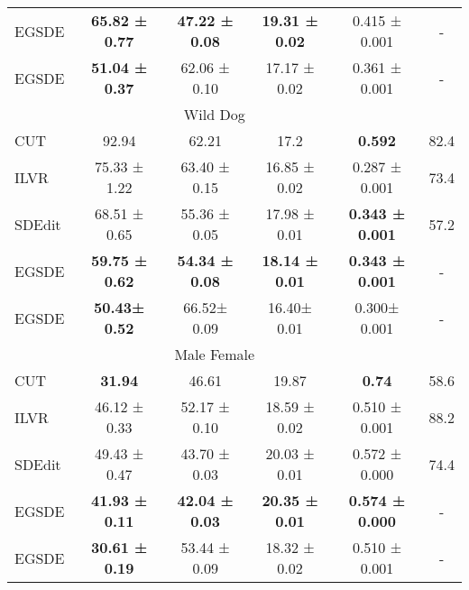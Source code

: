 \documentclass{article}
\begin{document}
\begin{table}
\begin{tabular}{lccccc}
EGSDE & \textbf{65.82 ± 0.77} & \textbf{47.22 ± 0.08} & \textbf{19.31 ± 0.02} & 0.415 ± 0.001  &-         \\
EGSDE  & \textbf{51.04 ± 0.37} & 62.06 ± 0.10 & 17.17 ± 0.02  & 0.361 ± 0.001   & -        \\
\midrule
\multicolumn{5}{c}{Wild  Dog}                                                                         \\
\midrule
CUT~\cite{park2020contrastive}            & 92.94               & 62.21               & 17.2                & \textbf{0.592}  & 82.4       \\
\midrule
ILVR~\cite{choi2021ilvr}           & 75.33 ± 1.22          & 63.40 ± 0.15          & 16.85 ± 0.02          & 0.287 ± 0.001   & 73.4         \\
SDEdit~\cite{meng2021sdedit}         & 68.51 ± 0.65          & 55.36 ± 0.05          & 17.98 ± 0.01          & \textbf{0.343 ± 0.001} & 57.2  \\
EGSDE & \textbf{59.75 ± 0.62} & \textbf{54.34 ± 0.08} & \textbf{18.14 ± 0.01} & \textbf{0.343 ± 0.001} &- \\
EGSDE   & \textbf{50.43± 0.52} & 66.52± 0.09 & 16.40± 0.01 & 0.300± 0.001    &-      \\
\midrule
\multicolumn{5}{c}{Male  Female}                                                         \\
\midrule
CUT~\cite{park2020contrastive}  & \textbf{31.94}               & 46.61               & 19.87             & \textbf{0.74}  & 58.6        \\
\midrule
ILVR~\cite{choi2021ilvr}           & 46.12 ± 0.33            & 52.17 ± 0.10                    &   18.59 ± 0.02                  &   0.510 ± 0.001       & 88.2               \\
SDEdit~\cite{meng2021sdedit}         & 49.43 ± 0.47              & 43.70 ± 0.03              & 20.03 ± 0.01             & 0.572 ± 0.000    & 74.4              \\

EGSDE & \textbf{41.93 ± 0.11}     & \textbf{42.04 ± 0.03}      & \textbf{20.35 ± 0.01}      & \textbf{0.574 ± 0.000}& -        \\
EGSDE & \textbf{30.61 ± 0.19}     & 53.44 ± 0.09      & 18.32 ± 0.02     & 0.510 ± 0.001& -    \\    
\bottomrule
\end{tabular}
\end{table}
\end{document}
